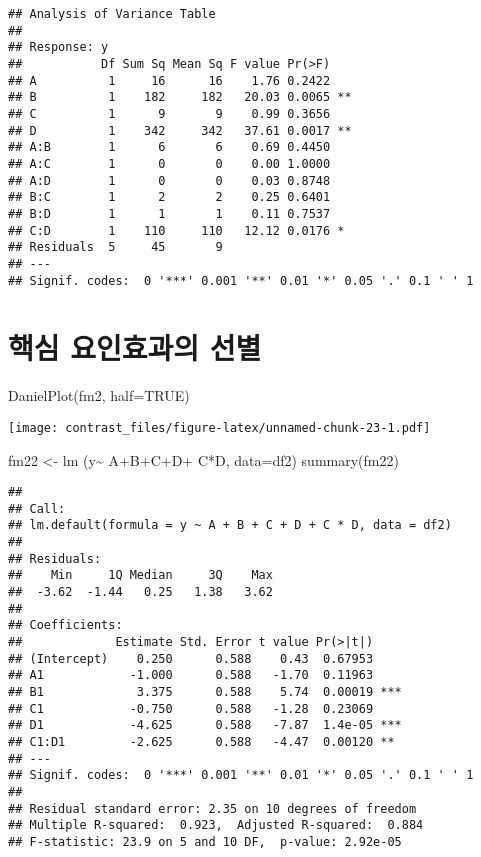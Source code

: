 \documentclass[
]{book}
\newenvironment{Shaded}{\begin{snugshade}}{\end{snugshade}}
\newcommand{\AttributeTok}[1]{\textcolor[rgb]{0.77,0.63,0.00}{#1}}
\newcommand{\ConstantTok}[1]{\textcolor[rgb]{0.00,0.00,0.00}{#1}}
\newcommand{\FunctionTok}[1]{\textcolor[rgb]{0.00,0.00,0.00}{#1}}
\newcommand{\NormalTok}[1]{#1}
\newcommand{\OtherTok}[1]{\textcolor[rgb]{0.56,0.35,0.01}{#1}}
\newcommand{\SpecialCharTok}[1]{\textcolor[rgb]{0.00,0.00,0.00}{#1}}
\begin{document}
\begin{verbatim}
## Analysis of Variance Table
## 
## Response: y
##           Df Sum Sq Mean Sq F value Pr(>F)   
## A          1     16      16    1.76 0.2422   
## B          1    182     182   20.03 0.0065 **
## C          1      9       9    0.99 0.3656   
## D          1    342     342   37.61 0.0017 **
## A:B        1      6       6    0.69 0.4450   
## A:C        1      0       0    0.00 1.0000   
## A:D        1      0       0    0.03 0.8748   
## B:C        1      2       2    0.25 0.6401   
## B:D        1      1       1    0.11 0.7537   
## C:D        1    110     110   12.12 0.0176 * 
## Residuals  5     45       9                  
## ---
## Signif. codes:  0 '***' 0.001 '**' 0.01 '*' 0.05 '.' 0.1 ' ' 1
\end{verbatim}

\hypertarget{uxd575uxc2ec-uxc694uxc778uxd6a8uxacfcuxc758-uxc120uxbcc4-1}{%
\section{핵심 요인효과의 선별}\label{uxd575uxc2ec-uxc694uxc778uxd6a8uxacfcuxc758-uxc120uxbcc4-1}}

\begin{Shaded}
\begin{Highlighting}[]
\FunctionTok{DanielPlot}\NormalTok{(fm2, }\AttributeTok{half=}\ConstantTok{TRUE}\NormalTok{)}
\end{Highlighting}
\end{Shaded}

\texttt{[image: contrast\_files/figure-latex/unnamed-chunk-23-1.pdf]}

\begin{Shaded}
\begin{Highlighting}[]
\NormalTok{fm22 }\OtherTok{\textless{}{-}} \FunctionTok{lm}\NormalTok{ (y}\SpecialCharTok{\textasciitilde{}}\NormalTok{ A}\SpecialCharTok{+}\NormalTok{B}\SpecialCharTok{+}\NormalTok{C}\SpecialCharTok{+}\NormalTok{D}\SpecialCharTok{+}\NormalTok{ C}\SpecialCharTok{*}\NormalTok{D, }\AttributeTok{data=}\NormalTok{df2) }
\FunctionTok{summary}\NormalTok{(fm22)}
\end{Highlighting}
\end{Shaded}

\begin{verbatim}
## 
## Call:
## lm.default(formula = y ~ A + B + C + D + C * D, data = df2)
## 
## Residuals:
##    Min     1Q Median     3Q    Max 
##  -3.62  -1.44   0.25   1.38   3.62 
## 
## Coefficients:
##             Estimate Std. Error t value Pr(>|t|)    
## (Intercept)    0.250      0.588    0.43  0.67953    
## A1            -1.000      0.588   -1.70  0.11963    
## B1             3.375      0.588    5.74  0.00019 ***
## C1            -0.750      0.588   -1.28  0.23069    
## D1            -4.625      0.588   -7.87  1.4e-05 ***
## C1:D1         -2.625      0.588   -4.47  0.00120 ** 
## ---
## Signif. codes:  0 '***' 0.001 '**' 0.01 '*' 0.05 '.' 0.1 ' ' 1
## 
## Residual standard error: 2.35 on 10 degrees of freedom
## Multiple R-squared:  0.923,  Adjusted R-squared:  0.884 
## F-statistic: 23.9 on 5 and 10 DF,  p-value: 2.92e-05
\end{verbatim}
\end{document}

